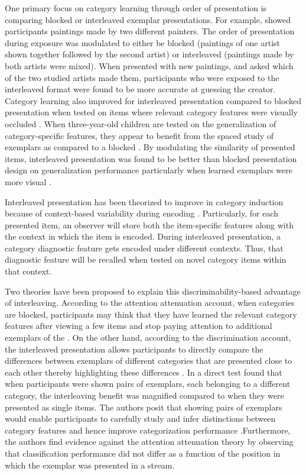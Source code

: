One primary focus on category learning through order of presentation is comparing blocked or interleaved exemplar presentations. For example, \cite{kornell2008learning} showed participants paintings made by two different painters. The order of presentation during exposure was modulated to either be blocked (paintings of one artist shown together followed by the second artist) or interleaved (paintings made by both artists were mixed). When presented with new paintings, and asked which of the two studied artists made them, participants who were exposed to the interleaved format were found to be more accurate at guessing the creator. Category learning also improved for interleaved presentation compared to blocked presentation when tested on items where relevant category features were visually occluded \parencite{whitehead2021transfer}. When three-year-old children are tested on the generalization of category-specific features, they appear to benefit from the spaced study of exemplars as compared to a blocked \parencite{vlach2008spacing}. By modulating the similarity of presented items, interleaved presentation was found to be better than blocked presentation design on generalization performance particularly when learned exemplars were more visual \parencite{kornell2008learning, carvalho2014putting}. 

Interleaved presentation has been theorized to improve in category induction because of context-based variability during encoding \parencite{glenberg1979component}. Particularly, for each presented item, an observer will store both the item-specific features along with the context in which the item is encoded. During interleaved presentation, a category diagnostic feature gets encoded under different contexts. Thus, that diagnostic feature will be recalled when tested on novel category items within that context. 

Two theories have been proposed to explain this discriminability-based advantage of interleaving. According to the attention attenuation account, when categories are blocked, participants may think that they have learned the relevant category features after viewing a few items and stop paying attention to additional exemplars of the \parencite{kornell2010spacing}. On the other hand, according to the discrimination account, the interleaved presentation allows participants to directly compare the differences between exemplars of different categories that are presented close to each other thereby highlighting these differences \parencite{kornell2008learning}. In a direct test \cite{wahlheim2011spacing} found that when participants were shown pairs of exemplars, each belonging to a different category, the interleaving benefit was magnified compared to when they were presented as single items. The authors posit that showing pairs of exemplars would enable participants to carefully study and infer distinctions between category features and hence improve categorization performance .Furthermore, the authors find evidence against the attention attenuation theory by observing that classification performance did not differ as a function of the position in which the exemplar was presented in a stream.

